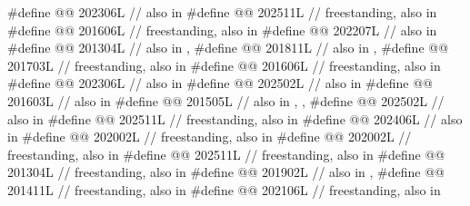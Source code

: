 \begin{codeblock}
#define @@             202306L // also in 
#define @@                      202511L // freestanding, also in 
#define @@                           201606L // freestanding, also in 
#define @@                         202207L // also in 
#define @@        201304L // also in , 
#define @@          201811L
  // also in , 
#define @@        201703L // freestanding, also in 
#define @@ 201606L // freestanding, also in 
#define @@                    202306L // also in 
#define @@                              202502L // also in 
#define @@                             201603L // also in 
#define @@     201505L
  // also in , , 
#define @@                          202502L // also in 
#define @@                  202511L
  // freestanding, also in 
#define @@                    202406L // also in 
#define @@                          202002L // freestanding, also in 
#define @@      202002L // freestanding, also in 
#define @@                  202511L // freestanding, also in 
#define @@        201304L // freestanding, also in 
#define @@                       201902L // also in , 
#define @@                            201411L // freestanding, also in 
#define @@                          202106L // freestanding, also in 

\end{codeblock}
